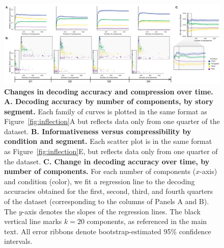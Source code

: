 \documentclass[english, 11pt]{article}
\begin{document}
\begin{figure}[tp]
  \centering
  \includegraphics[width=\textwidth]{figs/information_and_compression_over_time}

\caption{\textbf{Changes in decoding accuracy and compression over time.}
\textbf{A. Decoding accuracy by number of components, by story segment.} Each
family of curves is plotted in the same format as Figure~\ref{fig:inflection}A
but reflects data only from one quarter of the dataset. \textbf{B.
Informativeness versus compressibility by condition and segment.} Each scatter
plot is in the same format as Figure~\ref{fig:inflection}E, but reflects data
only from one quarter of the dataset. \textbf{C. Change in decoding accuracy
over time, by number of components.} For each number of components ($x$-axis)
and condition (color), we fit a regression line to the decoding accuracies
obtained for the first, second, third, and fourth quarters of the dataset
(corresponding to the columns of Panels A and B). The $y$-axis denotes the
slopes of the regression lines. The black vertical line marks $k = 20$ components,
as referenced in the main text.  All error ribbons denote bootstrap-estimated
95\% confidence intervals.}

\label{fig:inflection-quarters}

\end{figure}
\end{document}
